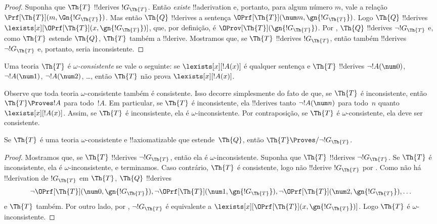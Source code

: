 \documentclass[../../../include/open-logic-section]{subfiles}
\begin{document}
\begin{proof}
Suponha que $\Th{T}$ !!{derive}s $!G_\Th{T}$. Então \emph{existe}
!!a{derivation} e, portanto, para algum número $m$, vale a relação
$\Prf[\Th{T}](m, \Gn{!G_\Th{T}})$. Mas então $\Th{Q}$ !!{derive}s a sentença
$\OPrf[\Th{T}](\num m, \gn{!G_\Th{T}})$. Logo $\Th{Q}$ !!{derive}s
$\lexists[x][\OPrf[\Th{T}](x,\gn{!G_\Th{T}})]$, que, por definição, é
$\OProv[\Th{T}](\gn{!G_\Th{T}})$. Por , $\Th{Q}$ !!{derive}s
$\lnot !G_\Th{T}$ e, como $\Th{T}$ estende $\Th{Q}$, $\Th{T}$ também a
!!{derive}. Mostramos que, se $\Th{T}$ !!{derive}s $!G_\Th{T}$, então também
!!{derive}s $\lnot !G_\Th{T}$ e, portanto, seria inconsistente.
\end{proof}

\begin{defn}
Uma teoria $\Th{T}$ é \emph{$\omega$-consistente} se vale o seguinte: se
$\lexists[x][!A(x)]$ é qualquer sentença e $\Th{T}$ !!{derive}s $\lnot
!A(\num 0)$, $\lnot !A(\num 1)$, $\lnot !A(\num 2)$, \dots, então $\Th{T}$
não prova $\lexists[x][!A(x)]$.
\end{defn}

Observe que toda teoria $\omega$-consistente também é consistente. Isso
decorre simplesmente do fato de que, se $\Th{T}$ é inconsistente, então
$\Th{T} \Proves !A$ para todo~$!A$. Em particular, se $\Th{T}$ é
inconsistente, ela !!{derive}s tanto $\lnot !A(\num n)$ para todo~$n$ quanto
$\lexists[x][!A(x)]$. Assim, se $\Th{T}$ é inconsistente, ela é
$\omega$-inconsistente. Por contraposição, se $\Th{T}$ é
$\omega$-consistente, ela deve ser consistente.

\begin{lem}
Se $\Th{T}$ é uma teoria $\omega$-consistente e !!{axiomatizable} que
estende~$\Th{Q}$, então $\Th{T} \Proves/ \lnot !G_\Th{T}$.
\end{lem}

\begin{proof}
Mostramos que, se $\Th{T}$ !!{derive}s $\lnot !G_\Th{T}$, então ela é
$\omega$-inconsistente. Suponha que $\Th{T}$ !!{derive}s
$\lnot !G_\Th{T}$. Se $\Th{T}$ é inconsistente, ela é
$\omega$-inconsistente, e terminamos. Caso contrário, $\Th{T}$ é
consistente, logo não !!{derive} $!G_\Th{T}$ por
. Como não há !!{derivation} de $!G_\Th{T}$ em
$\Th{T}$, $\Th{Q}$ !!{derive}s
\[
\lnot \OPrf[\Th{T}](\num 0, \gn{!G_\Th{T}}), \lnot \OPrf[\Th{T}](\num 1,
\gn{!G_\Th{T}}), \lnot \OPrf[\Th{T}](\num 2, \gn{!G_\Th{T}}), \dots
\]
e $\Th{T}$ também. Por outro lado, por ,
$\lnot !G_\Th{T}$ é equivalente a
$\lexists[x][\OPrf[\Th{T}](x,\gn{!G_\Th{T}})]$. Logo $\Th{T}$ é
$\omega$-inconsistente.
\end{proof}
\end{document}
